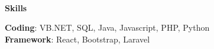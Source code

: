 \begin{flushleft}
    \hrulefill \\
    \begin{large}
        \textbf{Skills} \\
    \end{large} 
\end{flushleft}
\textbf{Coding}: VB.NET, SQL, Java, Javascript, PHP, Python \\
\textbf{Framework}: React, Bootstrap, Laravel
